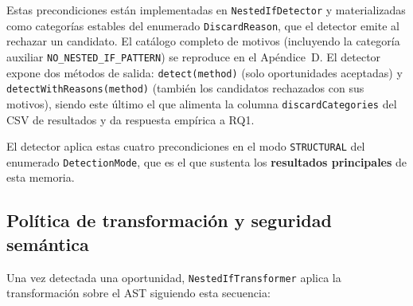 Estas precondiciones están implementadas en \texttt{NestedIfDetector} y
materializadas como categorías estables del enumerado
\texttt{DiscardReason}, que el detector emite al rechazar un candidato. El
catálogo completo de motivos (incluyendo la categoría auxiliar
\texttt{NO\_NESTED\_IF\_PATTERN}) se reproduce en el
Apéndice~D. El detector expone dos métodos de salida:
\texttt{detect(method)} (solo oportunidades aceptadas) y
\texttt{detectWithReasons(method)} (también los candidatos rechazados con
sus motivos), siendo este último el que alimenta la columna
\texttt{discardCategories} del CSV de resultados y da respuesta empírica a
RQ1.

El detector aplica estas cuatro precondiciones en el modo \texttt{STRUCTURAL}
del enumerado \texttt{DetectionMode}, que es el que sustenta los
\textbf{resultados principales} de esta memoria.

\subsection{Política de transformación y seguridad semántica}

Una vez detectada una oportunidad, \texttt{NestedIfTransformer} aplica la transformación sobre el AST siguiendo esta secuencia:

